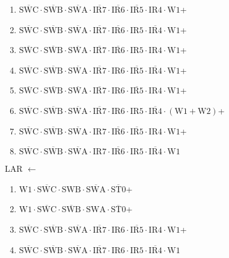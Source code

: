 \documentclass[UTF8]{ctexart}
\begin{document}
\begin{enumerate}[\indent\indent]
	\item $\overline{\text{SWC}} \cdot\overline{\text{SWB}}\cdot \overline{\text{SWA}} \cdot \overline{\text{IR7}} \cdot \overline{\text{IR6}} \cdot \overline{\text{IR5}} \cdot \text{IR4} \cdot \text{W1}$+
	\item $\overline{\text{SWC}} \cdot\overline{\text{SWB}}\cdot \overline{\text{SWA}} \cdot \overline{\text{IR7}} \cdot \overline{\text{IR6}} \cdot \text{IR5} \cdot \overline{\text{IR4}} \cdot \text{W1}$+
	\item $\overline{\text{SWC}} \cdot\overline{\text{SWB}}\cdot \overline{\text{SWA}} \cdot \overline{\text{IR7}} \cdot \overline{\text{IR6}} \cdot \text{IR5} \cdot \text{IR4} \cdot \text{W1}$+
	\item $\overline{\text{SWC}} \cdot\overline{\text{SWB}}\cdot \overline{\text{SWA}} \cdot \overline{\text{IR7}} \cdot \text{IR6} \cdot \overline{\text{IR5}} \cdot \overline{\text{IR4}} \cdot \text{W1}$+
	\item $\overline{\text{SWC}} \cdot\overline{\text{SWB}}\cdot \overline{\text{SWA}} \cdot \overline{\text{IR7}} \cdot \text{IR6} \cdot \overline{\text{IR5}} \cdot \text{IR4} \cdot \text{W1}$+
	\item $\overline{\text{SWC}} \cdot\overline{\text{SWB}}\cdot \overline{\text{SWA}} \cdot \overline{\text{IR7}} \cdot \text{IR6} \cdot \text{IR5} \cdot \overline{\text{IR4}} \cdot (\text{W1} + \text{W2})$+
	\item $\overline{\text{SWC}} \cdot\overline{\text{SWB}}\cdot \overline{\text{SWA}} \cdot \text{IR7} \cdot \overline{\text{IR6}} \cdot \overline{\text{IR5}} \cdot \text{IR4} \cdot \text{W1}$+
	\item $\overline{\text{SWC}} \cdot\overline{\text{SWB}}\cdot \overline{\text{SWA}} \cdot \text{IR7} \cdot \overline{\text{IR6}} \cdot \text{IR5} \cdot \overline{\text{IR4}} \cdot \text{W1}$
\end{enumerate}
\noindent LAR $\leftarrow$
\begin{enumerate}[\indent\indent]
	\item $\text{W1} \cdot \overline{\text{SWC}} \cdot \text{SWB} \cdot \overline{\text{SWA}} \cdot \overline{\text{ST0}}$+
	\item $\text{W1} \cdot \overline{\text{SWC}} \cdot \overline{\text{SWB}} \cdot \text{SWA} \cdot \overline{\text{ST0}}$+
	\item $\overline{\text{SWC}} \cdot\overline{\text{SWB}}\cdot \overline{\text{SWA}} \cdot \overline{\text{IR7}} \cdot \text{IR6} \cdot \overline{\text{IR5}} \cdot \text{IR4} \cdot \text{W1}$+
	\item $\overline{\text{SWC}} \cdot\overline{\text{SWB}}\cdot \overline{\text{SWA}} \cdot \overline{\text{IR7}} \cdot \text{IR6} \cdot \text{IR5} \cdot \overline{\text{IR4}} \cdot \text{W1}$
\end{enumerate}
\end{document}
